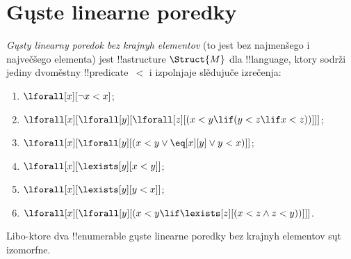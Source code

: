 \documentclass[../../../include/open-logic-section]{subfiles}
\begin{document}
\section{Gųste linearne poredky}

\begin{defn}
  \emph{Gųsty linearny poredok bez krajnyh elementov} (to jest bez
  najmenšego i največšego elementa) jest !!a{structure}
  $\Struct{M}$ dla !!{language}, ktory sodrži jediny dvoměstny
  !!{predicate}~$<$ i izpolnjaje slědujuče izrečenja:
  \begin{enumerate}
  \item $\lforall[x][\lnot x < x]$;
  \item $\lforall[x][\lforall[y][\lforall[z][(x < y \lif (y < z \lif x
    <z ))]]]$;
  \item $\lforall[x][\lforall[y][(x< y \lor \eq[x][y] \lor y < x)]]$;
  \item $\lforall[x][\lexists[y][x < y]]$;
  \item $\lforall[x][\lexists[y][y < x]]$;
  \item $\lforall[x][\lforall[y][(x < y \lif \lexists[z][(x < z \land
        z < y))]]]$.
 \end{enumerate}
\end{defn}

\begin{thm}
  Libo-ktore dva !!{enumerable} gųste linearne poredky bez krajnyh
  elementov sųt izomorfne.
\end{thm}
\end{document}
